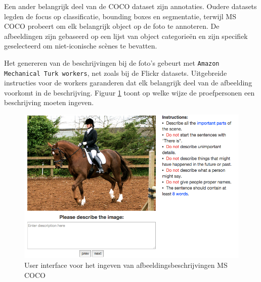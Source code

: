 Een ander belangrijk deel van de COCO dataset zijn annotaties. Oudere datasets legden de focus op classificatie, bounding boxes en segmentatie, terwijl MS COCO probeert om elk belangrijk object op de foto te annoteren. De afbeeldingen zijn gebaseerd op een lijst van object categorie\"en en zijn specifiek geselecteerd om niet-iconische sc\`enes te bevatten.

Het genereren van de beschrijvingen bij de foto's gebeurt met \texttt{Amazon Mechanical Turk workers}, net zoals bij de Flickr datasets. Uitgebreide instructies voor de workers garanderen dat elk belangrijk deel van de afbeelding voorkomt in de beschrijving\cite{Rampf2015}. Figuur \ref{fig:coco_ui} toont op welke wijze de proefpersonen een beschrijving moeten ingeven.


\begin{figure}[tb]
    \centering
    \includegraphics[width=0.8\linewidth]{Images/coco_UI.png}
    \caption{User interface voor het ingeven van afbeeldingsbeschrijvingen MS COCO}
    \label{fig:coco_ui}
\end{figure}

